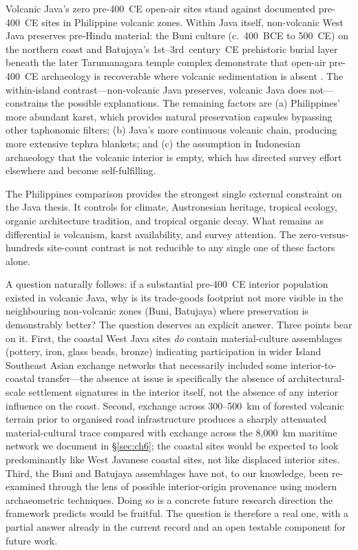 \documentclass[12pt,a4paper]{article}
\begin{document}
Volcanic Java's zero pre-400~CE open-air sites stand against documented pre-400~CE sites in Philippine volcanic zones. Within Java itself, non-volcanic West Java preserves pre-Hindu material: the Buni culture (c.~400~BCE to 500~CE) on the northern coast and Batujaya's 1st--3rd~century~CE prehistoric burial layer beneath the later Tarumanagara temple complex demonstrate that open-air pre-400~CE archaeology is recoverable where volcanic sedimentation is absent \citep{manguin2011,wibisono1994}. The within-island contrast---non-volcanic Java preserves, volcanic Java does not---constrains the possible explanations. The remaining factors are (a) Philippines' more abundant karst, which provides natural preservation capsules bypassing other taphonomic filters; (b) Java's more continuous volcanic chain, producing more extensive tephra blankets; and (c) the assumption in Indonesian archaeology that the volcanic interior is empty, which has directed survey effort elsewhere and become self-fulfilling.

The Philippines comparison provides the strongest single external constraint on the Java thesis. It controls for climate, Austronesian heritage, tropical ecology, organic architecture tradition, and tropical organic decay. What remains as differential is volcanism, karst availability, and survey attention. The zero-versus-hundreds site-count contrast is not reducible to any single one of these factors alone.

A question naturally follows: if a substantial pre-400~CE interior population existed in volcanic Java, why is its trade-goods footprint not more visible in the neighbouring non-volcanic zones (Buni, Batujaya) where preservation is demonstrably better? The question deserves an explicit answer. Three points bear on it. First, the coastal West Java sites \textit{do} contain material-culture assemblages (pottery, iron, glass beads, bronze) indicating participation in wider Island Southeast Asian exchange networks that necessarily included some interior-to-coastal transfer---the absence at issue is specifically the absence of architectural-scale settlement signatures in the interior itself, not the absence of any interior influence on the coast. Second, exchange across 300--500~km of forested volcanic terrain prior to organised road infrastructure produces a sharply attenuated material-cultural trace compared with exchange across the 8{,}000~km maritime network we document in \S\ref{sec:ch6}; the coastal sites would be expected to look predominantly like West Javanese coastal sites, not like displaced interior sites. Third, the Buni and Batujaya assemblages have not, to our knowledge, been re-examined through the lens of possible interior-origin provenance using modern archaeometric techniques. Doing so is a concrete future research direction the framework predicts would be fruitful. The question is therefore a real one, with a partial answer already in the current record and an open testable component for future work.
\end{document}
